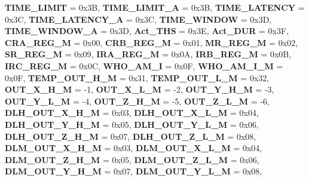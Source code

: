 \begin{DoxyCompactItemize}
{\bfseries T\+I\+M\+E\+\_\+\+L\+I\+M\+IT} = 0x3B, 
{\bfseries T\+I\+M\+E\+\_\+\+L\+I\+M\+I\+T\+\_\+A} = 0x3B, 
\newline
{\bfseries T\+I\+M\+E\+\_\+\+L\+A\+T\+E\+N\+CY} = 0x3C, 
{\bfseries T\+I\+M\+E\+\_\+\+L\+A\+T\+E\+N\+C\+Y\+\_\+A} = 0x3C, 
{\bfseries T\+I\+M\+E\+\_\+\+W\+I\+N\+D\+OW} = 0x3D, 
{\bfseries T\+I\+M\+E\+\_\+\+W\+I\+N\+D\+O\+W\+\_\+A} = 0x3D, 
\newline
{\bfseries Act\+\_\+\+T\+HS} = 0x3E, 
{\bfseries Act\+\_\+\+D\+UR} = 0x3F, 
{\bfseries C\+R\+A\+\_\+\+R\+E\+G\+\_\+M} = 0x00, 
{\bfseries C\+R\+B\+\_\+\+R\+E\+G\+\_\+M} = 0x01, 
\newline
{\bfseries M\+R\+\_\+\+R\+E\+G\+\_\+M} = 0x02, 
{\bfseries S\+R\+\_\+\+R\+E\+G\+\_\+M} = 0x09, 
{\bfseries I\+R\+A\+\_\+\+R\+E\+G\+\_\+M} = 0x0A, 
{\bfseries I\+R\+B\+\_\+\+R\+E\+G\+\_\+M} = 0x0B, 
\newline
{\bfseries I\+R\+C\+\_\+\+R\+E\+G\+\_\+M} = 0x0C, 
{\bfseries W\+H\+O\+\_\+\+A\+M\+\_\+I} = 0x0F, 
{\bfseries W\+H\+O\+\_\+\+A\+M\+\_\+\+I\+\_\+M} = 0x0F, 
{\bfseries T\+E\+M\+P\+\_\+\+O\+U\+T\+\_\+\+H\+\_\+M} = 0x31, 
\newline
{\bfseries T\+E\+M\+P\+\_\+\+O\+U\+T\+\_\+\+L\+\_\+M} = 0x32, 
{\bfseries O\+U\+T\+\_\+\+X\+\_\+\+H\+\_\+M} = -\/1, 
{\bfseries O\+U\+T\+\_\+\+X\+\_\+\+L\+\_\+M} = -\/2, 
{\bfseries O\+U\+T\+\_\+\+Y\+\_\+\+H\+\_\+M} = -\/3, 
\newline
{\bfseries O\+U\+T\+\_\+\+Y\+\_\+\+L\+\_\+M} = -\/4, 
{\bfseries O\+U\+T\+\_\+\+Z\+\_\+\+H\+\_\+M} = -\/5, 
{\bfseries O\+U\+T\+\_\+\+Z\+\_\+\+L\+\_\+M} = -\/6, 
{\bfseries D\+L\+H\+\_\+\+O\+U\+T\+\_\+\+X\+\_\+\+H\+\_\+M} = 0x03, 
\newline
{\bfseries D\+L\+H\+\_\+\+O\+U\+T\+\_\+\+X\+\_\+\+L\+\_\+M} = 0x04, 
{\bfseries D\+L\+H\+\_\+\+O\+U\+T\+\_\+\+Y\+\_\+\+H\+\_\+M} = 0x05, 
{\bfseries D\+L\+H\+\_\+\+O\+U\+T\+\_\+\+Y\+\_\+\+L\+\_\+M} = 0x06, 
{\bfseries D\+L\+H\+\_\+\+O\+U\+T\+\_\+\+Z\+\_\+\+H\+\_\+M} = 0x07, 
\newline
{\bfseries D\+L\+H\+\_\+\+O\+U\+T\+\_\+\+Z\+\_\+\+L\+\_\+M} = 0x08, 
{\bfseries D\+L\+M\+\_\+\+O\+U\+T\+\_\+\+X\+\_\+\+H\+\_\+M} = 0x03, 
{\bfseries D\+L\+M\+\_\+\+O\+U\+T\+\_\+\+X\+\_\+\+L\+\_\+M} = 0x04, 
{\bfseries D\+L\+M\+\_\+\+O\+U\+T\+\_\+\+Z\+\_\+\+H\+\_\+M} = 0x05, 
\newline
{\bfseries D\+L\+M\+\_\+\+O\+U\+T\+\_\+\+Z\+\_\+\+L\+\_\+M} = 0x06, 
{\bfseries D\+L\+M\+\_\+\+O\+U\+T\+\_\+\+Y\+\_\+\+H\+\_\+M} = 0x07, 
{\bfseries D\+L\+M\+\_\+\+O\+U\+T\+\_\+\+Y\+\_\+\+L\+\_\+M} = 0x08, 

\end{DoxyCompactItemize}
